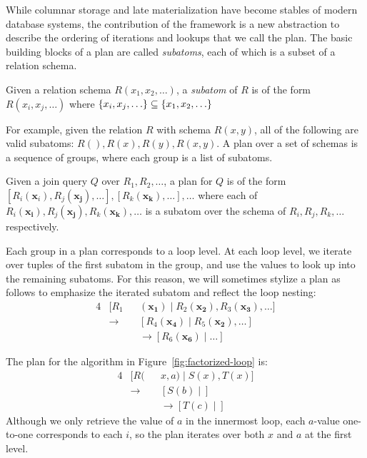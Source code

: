 While columnar storage and late materialization have become stables of
modern database systems,
the contribution of the \FJ framework is a new abstraction
to describe the ordering of iterations and lookups
that we call the \FJ plan.
The basic building blocks of a \FJ plan are
called {\em subatoms}, each of which is a subset of a relation schema.
%
\begin{definition}
  Given a relation schema $R(x_1, x_2, \ldots)$,
  a \emph{subatom} of $R$ is of the form $R(x_i, x_j, \ldots)$
  where $\{x_i, x_j, \ldots\} \subseteq \{x_1, x_2, \ldots\}$
\end{definition}
%
For example, given the relation $R$ with schema $R(x, y)$,
all of the following are valid subatoms: $R(), R(x), R(y), R(x, y)$.
A \FJ plan over a set of schemas is a sequence of groups,
where each group is a list of subatoms.
%
\begin{definition}
  Given a join query $Q$ over $R_1, R_2, \ldots$,
  a \FJ plan for $Q$ is of the form $[R_i(\mathbf{x}_i), R_j(\mathbf{x_j}), \ldots],
    [R_k(\mathbf{x_k}), \ldots], \ldots$ where each of
  $R_i(\mathbf{x_i}), R_j(\mathbf{x_j}), R_k(\mathbf{x_k}), \ldots$
  is a subatom over the schema of $R_i, R_j, R_k, \ldots$ respectively.
\end{definition}
%
Each group in a \FJ plan corresponds to a loop level.
At each loop level,
we iterate over tuples of the first subatom in the group,
and use the values to look up into the remaining subatoms.
For this reason, we will sometimes stylize a \FJ plan as follows
to emphasize the iterated subatom and reflect the loop nesting:
\begin{alignat*}{4}
   & [R_1        &  & (\mathbf{x_1})\mid R_2(\mathbf{x_2}), R_3(\mathbf{x_3}), \ldots] \\
   & \rightarrow &  & [R_4(\mathbf{x_4})\mid R_5(\mathbf{x_2}), \ldots]                \\
   &             &  & \rightarrow [R_6(\mathbf{x_6})\mid \ldots]
\end{alignat*}
%
%
\begin{example}
  The \FJ plan for the algorithm in Figure~\ref{fig:factorized-loop}
  is:
  \begin{alignat*}{4}
     & [R(         &  & x, a) \mid S(x), T(x)]   \\
     & \rightarrow &  & [S(b) \mid ]             \\
     &             &  & \rightarrow [T(c) \mid ]
  \end{alignat*}
  Although we only retrieve the value of $a$ in the innermost loop,
  each $a$-value one-to-one corresponds to each $i$,
  so the plan iterates over both $x$ and $a$ at the first level.
\end{example}
